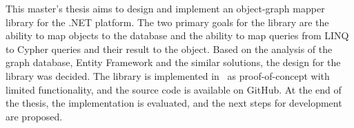 This master's thesis aims to design and implement an object-graph mapper library for the .NET platform.
The two primary goals for the library are the ability to map objects to the database and the ability to map queries from LINQ to Cypher queries and their result to the object.
Based on the analysis of the graph database, Entity Framework and the similar solutions, the design for the library was decided.
The library is implemented in \CS\ as proof-of-concept with limited functionality, and the source code is available on GitHub.
At the end of the thesis, the implementation is evaluated, and the next steps for development are proposed.